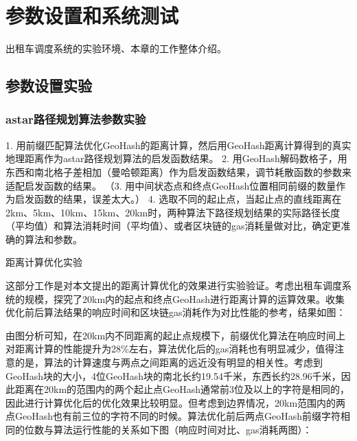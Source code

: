 \chapter{参数设置和系统测试}
出租车调度系统的实验环境、本章的工作整体介绍。

\section{参数设置实验}
\subsection{astar路径规划算法参数实验}
1. 用前缀匹配算法优化GeoHash的距离计算，然后用GeoHash距离计算得到的真实地理距离作为astar路径规划算法的启发函数结果。
2. 用GeoHash解码数格子，用东西和南北格子差相加（曼哈顿距离）作为启发函数结果，调节耗散函数的参数来适配启发函数的结果。
（3. 用中间状态点和终点GeoHash位置相同前缀的数量作为启发函数的结果，误差太大。）
4. 选取不同的起止点，当起止点的直线距离在2km、5km、10km、15km、20km时，两种算法下路径规划结果的实际路径长度（平均值）和算法消耗时间（平均值）、或者区块链的gas消耗量做对比，确定更准确的算法和参数。

距离计算优化实验

这部分工作是对本文提出的距离计算优化的效果进行实验验证。考虑出租车调度系统的规模，探究了20km内的起点和终点GeoHash进行距离计算的运算效果。收集优化前后算法结果的响应时间和区块链gas消耗作为对比性能的参考，结果如图：


由图分析可知，在20km内不同距离的起止点规模下，前缀优化算法在响应时间上对距离计算的性能提升为28$\%$左右，算法优化后的gas消耗也有明显减少，值得注意的是，算法的计算速度与两点之间距离的远近没有明显的相关性。考虑到GeoHash块的大小，4位GeoHash块的南北长约19.54千米，东西长约28.96千米，因此距离在20km的范围内的两个起止点GeoHash通常前3位及以上的字符是相同的，因此进行计算优化后的优化效果比较明显。但考虑到边界情况，20km范围内的两点GeoHash也有前三位的字符不同的时候。算法优化前后两点GeoHash前缀字符相同的位数与算法运行性能的关系如下图（响应时间对比、gas消耗两图）：


